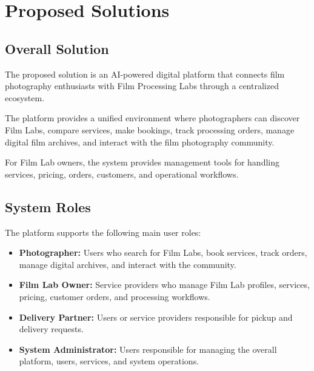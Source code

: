 
\section{Proposed Solutions}

\subsection{Overall Solution}

The proposed solution is an AI-powered digital platform that connects film photography enthusiasts with Film Processing Labs through a centralized ecosystem.

The platform provides a unified environment where photographers can discover Film Labs, compare services, make bookings, track processing orders, manage digital film archives, and interact with the film photography community.

For Film Lab owners, the system provides management tools for handling services, pricing, orders, customers, and operational workflows.

\subsection{System Roles}

The platform supports the following main user roles:

\begin{itemize}
    \item \textbf{Photographer:} Users who search for Film Labs, book services, track orders, manage digital archives, and interact with the community.
    
    \item \textbf{Film Lab Owner:} Service providers who manage Film Lab profiles, services, pricing, customer orders, and processing workflows.
    
    \item \textbf{Delivery Partner:} Users or service providers responsible for pickup and delivery requests.
    
    \item \textbf{System Administrator:} Users responsible for managing the overall platform, users, services, and system operations.
\end{itemize}

